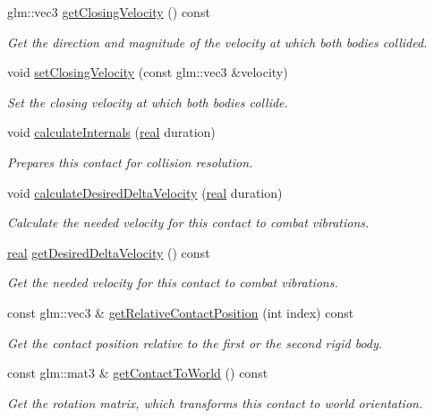 \begin{DoxyCompactItemize}
glm\+::vec3 \mbox{\hyperlink{classr3_1_1_contact_a4c02edbc7514fbc84cd1b7d70797619c}{get\+Closing\+Velocity}} () const
\begin{DoxyCompactList}\small\item\em Get the direction and magnitude of the velocity at which both bodies collided. \end{DoxyCompactList}\item 
void \mbox{\hyperlink{classr3_1_1_contact_a7b837cd82d64d93ce1a98cdd172dd868}{set\+Closing\+Velocity}} (const glm\+::vec3 \&velocity)
\begin{DoxyCompactList}\small\item\em Set the closing velocity at which both bodies collide. \end{DoxyCompactList}\item 
void \mbox{\hyperlink{classr3_1_1_contact_a4e00a32cb21ff4fc8ec826f163bcddae}{calculate\+Internals}} (\mbox{\hyperlink{namespacer3_ab2016b3e3f743fb735afce242f0dc1eb}{real}} duration)
\begin{DoxyCompactList}\small\item\em Prepares this contact for collision resolution. \end{DoxyCompactList}\item 
void \mbox{\hyperlink{classr3_1_1_contact_a3f2c146006389bf6273cdd078763b7a3}{calculate\+Desired\+Delta\+Velocity}} (\mbox{\hyperlink{namespacer3_ab2016b3e3f743fb735afce242f0dc1eb}{real}} duration)
\begin{DoxyCompactList}\small\item\em Calculate the needed velocity for this contact to combat vibrations. \end{DoxyCompactList}\item 
\mbox{\hyperlink{namespacer3_ab2016b3e3f743fb735afce242f0dc1eb}{real}} \mbox{\hyperlink{classr3_1_1_contact_aff234679aa4302b69b8dd101eb969705}{get\+Desired\+Delta\+Velocity}} () const
\begin{DoxyCompactList}\small\item\em Get the needed velocity for this contact to combat vibrations. \end{DoxyCompactList}\item 
const glm\+::vec3 \& \mbox{\hyperlink{classr3_1_1_contact_ade5794f7055fb30ff52f9193b92c6bf0}{get\+Relative\+Contact\+Position}} (int index) const
\begin{DoxyCompactList}\small\item\em Get the contact position relative to the first or the second rigid body. \end{DoxyCompactList}\item 
const glm\+::mat3 \& \mbox{\hyperlink{classr3_1_1_contact_a4e9692d870bdba44ff6b627b8c6c6e30}{get\+Contact\+To\+World}} () const
\begin{DoxyCompactList}\small\item\em Get the rotation matrix, which transforms this contact to world orientation. \end{DoxyCompactList}\end{DoxyCompactItemize}


